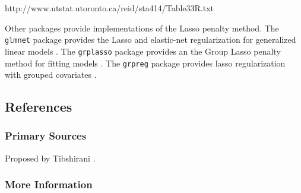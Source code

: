 http://www.utstat.utoronto.ca/reid/sta414/Table33R.txt




Other packages provide implementations of the Lasso penalty method.
The \texttt{glmnet} package provides the Lasso and elastic-net regularization for generalized linear models \cite{Friedman2011}.
The \texttt{grplasso} package provides an the Group Lasso penalty method for fitting models \cite{Meier2009}.
The \texttt{grpreg} package provides lasso regularization with grouped covariates \cite{Brehen2011}.


\subsection{References}

\subsubsection{Primary Sources}

Proposed by Tibshirani \cite{Tibshirani1996}.

\subsubsection{More Information}



